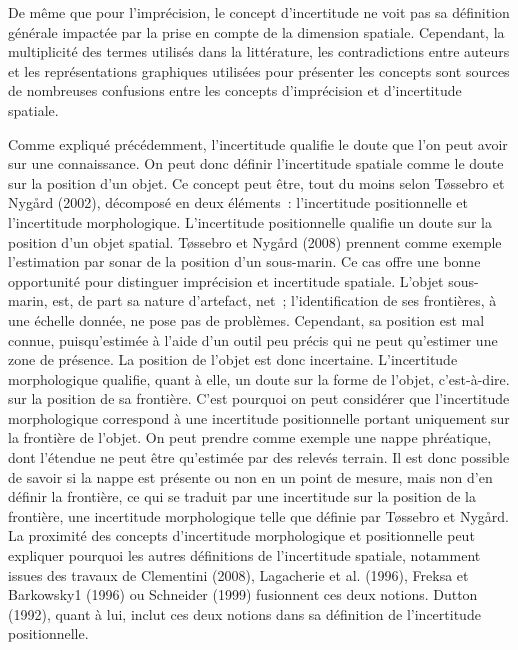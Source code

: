 De même que pour l’imprécision, le concept d’incertitude ne voit pas
sa définition générale impactée par la prise en compte de la dimension
spatiale. Cependant, la multiplicité des termes utilisés dans la
littérature, les contradictions entre auteurs et les représentations
graphiques utilisées pour présenter les concepts sont sources de
nombreuses confusions entre les concepts d’imprécision et
d’incertitude spatiale.

Comme expliqué précédemment, l’incertitude qualifie le doute que l’on
peut avoir sur une connaissance. On peut donc définir l’incertitude
spatiale comme le doute sur la position d’un objet. Ce concept peut
être, tout du moins selon Tøssebro et Nygård (2002), décomposé en deux
éléments : l’incertitude positionnelle et l’incertitude
morphologique. L’incertitude positionnelle qualifie un doute sur la
position d’un objet spatial. Tøssebro et Nygård (2008) prennent comme
exemple l’estimation par sonar de la position d’un sous-marin. Ce cas
offre une bonne opportunité pour distinguer imprécision et incertitude
spatiale. L’objet sous-marin, est, de part sa nature d’artefact, net ;
l’identification de ses frontières, à une échelle donnée, ne pose pas
de problèmes. Cependant, sa position est mal connue, puisqu’estimée à
l’aide d’un outil peu précis qui ne peut qu’estimer une zone de
présence. La position de l’objet est donc incertaine. L’incertitude
morphologique qualifie, quant à elle, un doute sur la forme de
l’objet, c’est-à-dire. sur la position de sa frontière. C’est pourquoi
on peut considérer que l’incertitude morphologique correspond à une
incertitude positionnelle portant uniquement sur la frontière de
l’objet. On peut prendre comme exemple une nappe phréatique, dont
l’étendue ne peut être qu’estimée par des relevés terrain. Il est donc
possible de savoir si la nappe est présente ou non en un point de
mesure, mais non d’en définir la frontière, ce qui se traduit par une
incertitude sur la position de la frontière, une incertitude
morphologique telle que définie par Tøssebro et Nygård. La proximité
des concepts d’incertitude morphologique et positionnelle peut
expliquer pourquoi les autres définitions de l’incertitude spatiale,
notamment issues des travaux de Clementini (2008), Lagacherie et
al. (1996), Freksa et Barkowsky1 (1996) ou Schneider (1999) fusionnent
ces deux notions. Dutton (1992), quant à lui, inclut ces deux notions
dans sa définition de l’incertitude positionnelle.


